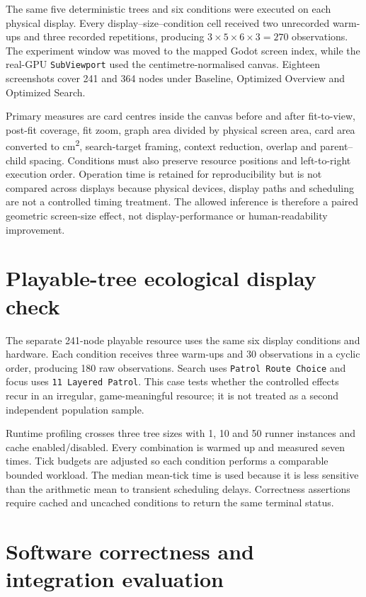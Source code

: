 The same five deterministic trees and six conditions were executed on each physical display. Every display--size--condition cell received two unrecorded warm-ups and three recorded repetitions, producing \(3\times5\times6\times3=270\) observations. The experiment window was moved to the mapped Godot screen index, while the real-\ac{GPU} \texttt{SubViewport} used the centimetre-normalised canvas. Eighteen screenshots cover 241 and 364 nodes under Baseline, Optimized Overview and Optimized Search.

Primary measures are card centres inside the canvas before and after fit-to-view, post-fit coverage, fit zoom, graph area divided by physical screen area, card area converted to cm\textsuperscript{2}, search-target framing, context reduction, overlap and parent--child spacing. Conditions must also preserve resource positions and left-to-right execution order. Operation time is retained for reproducibility but is not compared across displays because physical devices, display paths and scheduling are not a controlled timing treatment. The allowed inference is therefore a paired geometric screen-size effect, not display-performance or human-readability improvement.

\section{Playable-tree ecological display check}

The separate 241-node playable resource uses the same six display conditions and hardware. Each condition receives three warm-ups and 30 observations in a cyclic order, producing 180 raw observations. Search uses \texttt{Patrol Route Choice} and focus uses \texttt{11 Layered Patrol}. This case tests whether the controlled effects recur in an irregular, game-meaningful resource; it is not treated as a second independent population sample.

Runtime profiling crosses three tree sizes with 1, 10 and 50 runner instances and cache enabled/disabled. Every combination is warmed up and measured seven times. Tick budgets are adjusted so each condition performs a comparable bounded workload. The median mean-tick time is used because it is less sensitive than the arithmetic mean to transient scheduling delays. Correctness assertions require cached and uncached conditions to return the same terminal status.

\section{Software correctness and integration evaluation}

